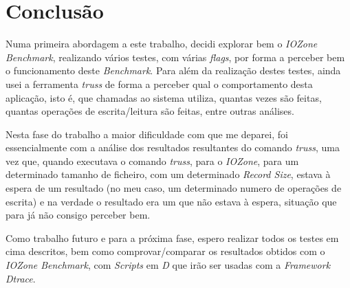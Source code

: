 \documentclass[conference,compsoc]{IEEEtran}
\begin{document}
\section{Conclusão}
Numa primeira abordagem a este trabalho, decidi explorar bem o \textit{IOZone Benchmark}, realizando vários testes, com várias \textit{flags}, por forma a perceber bem o funcionamento deste \textit{Benchmark}. Para além da realização destes testes, ainda usei a ferramenta \textit{truss} de forma a perceber qual o comportamento desta aplicação, isto é, que chamadas ao sistema utiliza, quantas vezes são feitas, quantas operações de escrita/leitura são feitas, entre outras análises.

Nesta fase do trabalho a maior dificuldade com que me deparei, foi essencialmente com a análise dos resultados resultantes do comando \textit{truss}, uma vez que, quando executava o comando \textit{truss}, para o \textit{IOZone}, para um determinado tamanho de ficheiro, com um determinado \textit{Record Size}, estava à espera de um resultado (no meu caso, um determinado numero de operações de escrita) e na verdade o resultado era um que não estava à espera, situação que para já não consigo perceber bem.

Como trabalho futuro e para a próxima fase, espero realizar todos os testes em cima descritos, bem como comprovar/comparar os resultados obtidos com o \textit{IOZone Benchmark}, com \textit{Scripts} em \textit{D} que irão ser usadas com a \textit{Framework Dtrace}.
%
%
\end{document}
